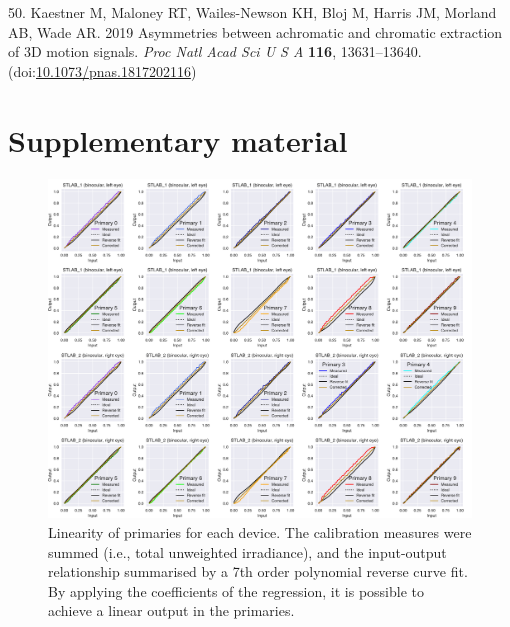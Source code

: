 \documentclass[
]{article}
\begin{document}
\leavevmode\hypertarget{ref-Kaestner2019}{}%
50. Kaestner M, Maloney RT, Wailes-Newson KH, Bloj M, Harris JM, Morland AB, Wade AR. 2019 Asymmetries between achromatic and chromatic extraction of 3D motion signals. \emph{Proc Natl Acad Sci U S A} \textbf{116}, 13631--13640. (doi:\href{https://doi.org/10.1073/pnas.1817202116}{10.1073/pnas.1817202116})

\pagebreak

\hypertarget{supplementary-material}{%
\section{Supplementary material}\label{supplementary-material}}

\setcounter{table}{0} \renewcommand{\thetable}{S\arabic{table}} \setcounter{figure}{0} \renewcommand{\thefigure}{S\arabic{figure}}

\begin{figure}

{\centering \includegraphics{Figures/gamma_figure} 

}

\caption{Linearity of primaries for each device. The calibration measures were summed (i.e., total unweighted irradiance), and the input-output relationship summarised by a 7th order polynomial reverse curve fit. By applying the coefficients of the regression, it is possible to achieve a linear output in the primaries.}\label{fig:primarylinearity}
\end{figure}
\end{document}
